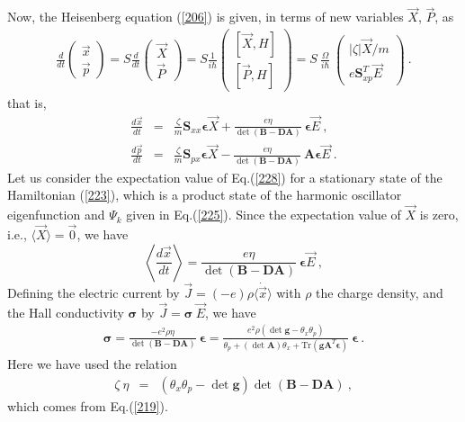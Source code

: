 \documentclass[a4paper,seceq]{ptptex}
\newcommand{\bfg}{ \boldsymbol{g} }
\newcommand{\bfA}{ \boldsymbol{A} }
\newcommand{\bfB}{ \boldsymbol{B} }
\newcommand{\bfD}{ \boldsymbol{D} }
\newcommand{\bfS}{ \boldsymbol{S} }
\newcommand{\bfeps}{\boldsymbol{\epsilon}}
\newcommand{\bfsig}{\boldsymbol{\sigma}}
\newcommand{\vecp}{ {\vec p} }
\newcommand{\vecx}{ {\vec x} }
\newcommand{\vecE}{ {\vec E} }
\newcommand{\vecJ}{ {\vec J} }
\newcommand{\vecP}{ {\vec P} }
\newcommand{\vecX}{ {\vec X} }
\newcommand{\Tr}{\mbox{Tr}}
\begin{document}
Now, the Heisenberg equation (\ref{206}) is given,
in terms of new variables $\vec{X}$, $\vec{P}$, as
\begin{eqnarray}
   \frac{d}{dt} \begin{pmatrix} \vecx \\ \vecp \end{pmatrix}
 = S \frac{d}{dt} \begin{pmatrix} \vecX \\ \vecP \end{pmatrix}
 = S \frac{1}{i\hbar }
   \begin{pmatrix}
      \left[\vecX, H\right] \\ \left[\vecP, H\right] \end{pmatrix}
 = S~\frac{\Omega}{i \hbar}~
 \begin{pmatrix} |\zeta| \vecX/m \\ e \bfS_{xp}^T \vecE \end{pmatrix}~.
\label{227}
\end{eqnarray}
that is,
\begin{eqnarray}
 \frac{d \vecx}{dt} 
  &=& \frac{\zeta}{m} \bfS_{xx} \bfeps \vecX
     + \frac{e \eta}{ \det( \bfB - \bfD \bfA ) }~\bfeps \vecE~, 
\label{228} \\
 \frac{d \vecp}{dt} 
  &=& \frac{\zeta}{m} \bfS_{px} \bfeps \vecX
     - \frac{ e \eta }{ \det( \bfB - \bfD \bfA ) }~\bfA \bfeps \vecE~.
\label{229}
\end{eqnarray}
Let us consider the expectation value of Eq.(\ref{228})
for a stationary state of the Hamiltonian (\ref{223}),
which is a product state of the harmonic oscillator eigenfunction and
$\Psi _k$ given in Eq.(\ref{225}).
Since the expectation value of $\vecX$ is zero, i.e.,
$\langle \vecX \rangle = \vec{0}$, we have
\begin{equation}
  \left\langle \frac{d \vecx}{dt} \right\rangle
  = \frac{ e \eta }{ \det( \bfB - \bfD \bfA ) }~\bfeps \vecE~,
\label{230}
\end{equation}
Defining the electric current by
$\vecJ = (- e) \rho \langle {\dot \vecx} \rangle$ with $\rho$
the charge density, and the Hall conductivity
$\bfsig$ by $\vecJ  = \bfsig~\vecE$, we have
\begin{eqnarray}
 \bfsig = \frac{ - e^2 \rho \eta }{ \det( \bfB - \bfD \bfA ) }~\bfeps
 = \frac{ e^2 \rho \left( \det \bfg - \theta_x \theta_p \right) }
{\theta_p + (\det\bfA) \theta_x + \Tr\left( \bfg \bfA^T \bfeps \right)
   }~\bfeps~.
\label{231}
\end{eqnarray}
Here we have used the relation
\begin{eqnarray}
 \zeta~\eta &=& \left( \theta_x \theta_p - \det \bfg \right)
                 \det( \bfB - \bfD \bfA )~,
\label{232}
\end{eqnarray}
which comes from Eq.(\ref{219}).
\end{document}
